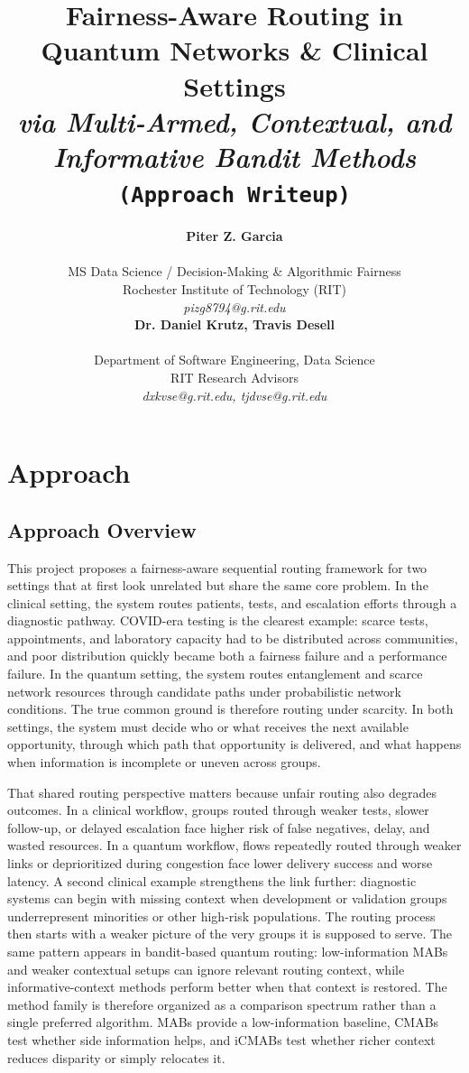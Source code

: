 \documentclass{IEEEtran}
\title{{\LARGE\textbf{Fairness-Aware Routing in Quantum Networks \& Clinical Settings}}\\
{\Large\textit{via Multi-Armed, Contextual, and Informative Bandit Methods}}\\
{\large\texttt{(Approach Writeup)}}}
\author{%
\begin{minipage}{0.48\textwidth}
\begin{center}
{\bf Piter Z. Garcia}\\
\begin{small}
MS Data Science / Decision-Making \& Algorithmic Fairness\\
Rochester Institute of Technology (RIT)\\
{\it pizg8794@g.rit.edu}
\end{small}
\end{center}
\end{minipage}
\hfill
\begin{minipage}{0.48\textwidth}
\begin{center}
{\bf Dr. Daniel Krutz, Travis Desell}\\
\begin{small}
Department of Software Engineering, Data Science\\
RIT Research Advisors\\
{\it dxkvse@g.rit.edu, tjdvse@g.rit.edu}
\end{small}
\end{center}
\end{minipage}%
}
\begin{document}
\maketitle
\vspace{-0.8em}

\section{Approach}

\subsection*{Approach Overview}
This project proposes a fairness-aware sequential routing framework for two settings that at first look unrelated but share the same core problem. In the clinical setting, the system routes patients, tests, and escalation efforts through a diagnostic pathway. COVID-era testing is the clearest example: scarce tests, appointments, and laboratory capacity had to be distributed across communities, and poor distribution quickly became both a fairness failure and a performance failure. In the quantum setting, the system routes entanglement and scarce network resources through candidate paths under probabilistic network conditions. The true common ground is therefore routing under scarcity. In both settings, the system must decide who or what receives the next available opportunity, through which path that opportunity is delivered, and what happens when information is incomplete or uneven across groups.

That shared routing perspective matters because unfair routing also degrades outcomes. In a clinical workflow, groups routed through weaker tests, slower follow-up, or delayed escalation face higher risk of false negatives, delay, and wasted resources. In a quantum workflow, flows repeatedly routed through weaker links or deprioritized during congestion face lower delivery success and worse latency. A second clinical example strengthens the link further: diagnostic systems can begin with missing context when development or validation groups underrepresent minorities or other high-risk populations. The routing process then starts with a weaker picture of the very groups it is supposed to serve. The same pattern appears in bandit-based quantum routing: low-information MABs and weaker contextual setups can ignore relevant routing context, while informative-context methods perform better when that context is restored. The method family is therefore organized as a comparison spectrum rather than a single preferred algorithm. MABs provide a low-information baseline, CMABs test whether side information helps, and iCMABs test whether richer context reduces disparity or simply relocates it.
\end{document}

